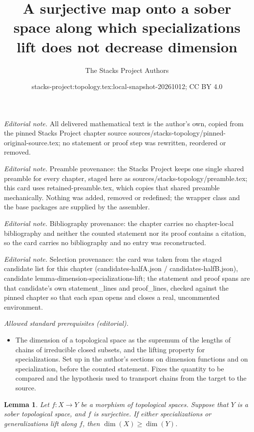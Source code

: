 \documentclass[10pt,a4paper]{amsart}
\title{A surjective map onto a sober space along which specializations lift does not decrease dimension}
\author{The Stacks Project Authors}
\date{stacks-project:topology.tex:local-snapshot-20261012; CC BY 4.0}
\theoremstyle{plain}
\newtheorem{lemma}[subsection]{Lemma}
\theoremstyle{definition}
\theoremstyle{remark}
\numberwithin{equation}{subsection}
\begin{document}
\maketitle
\noindent\textit{Editorial note.} All delivered mathematical text is the author's own, copied from the pinned Stacks Project chapter source sources/stacks-topology/pinned-original-source.tex; no statement or proof step was rewritten, reordered or removed.\par\medskip
\noindent\textit{Editorial note.} Preamble provenance: the Stacks Project keeps one single shared preamble for every chapter, staged here as sources/stacks-topology/preamble.tex; this card uses retained-preamble.tex, which copies that shared preamble mechanically. Nothing was added, removed or redefined; the wrapper class and the base packages are supplied by the assembler.\par\medskip
\noindent\textit{Editorial note.} Bibliography provenance: the chapter carries no chapter-local bibliography and neither the counted statement nor its proof contains a citation, so the card carries no bibliography and no entry was reconstructed.\par\medskip
\noindent\textit{Editorial note.} Selection provenance: the card was taken from the staged candidate list for this chapter (candidates-halfA.json / candidates-halfB.json), candidate lemma-dimension-specializations-lift; the statement and proof spans are that candidate's own statement\_lines and proof\_lines, checked against the pinned chapter so that each span opens and closes a real, uncommented environment.\par\medskip
\noindent\textit{Allowed standard prerequisites (editorial).}\begin{itemize}
\item The dimension of a topological space as the supremum of the lengths of chains of irreducible closed subsets, and the lifting property for specializations. Set up in the author's sections on dimension functions and on specialization, before the counted statement. Fixes the quantity to be compared and the hypothesis used to transport chains from the target to the source.
\end{itemize}\medskip
\begin{lemma}
\label{lemma-dimension-specializations-lift}
Let $f : X \to Y$ be a morphism of topological spaces.
Suppose that $Y$ is a sober topological space, and $f$ is surjective.
If either specializations or generalizations lift along $f$, then
$\dim(X) \geq \dim(Y)$.
\end{lemma}
\end{document}
